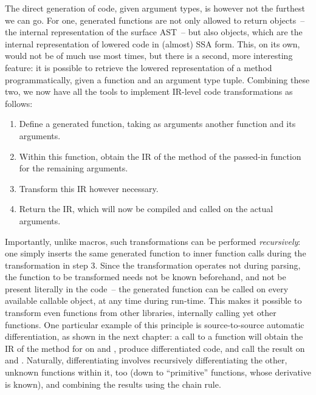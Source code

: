 The direct generation of code, given argument types, is however not the furthest we can go.  For
one, generated functions are not only allowed to return  objects~-- the internal
representation of the surface AST~-- but also  objects, which are the internal
representation of lowered code in (almost) SSA form.  This, on its own, would not be of much use
most times, but there is a second, more interesting feature: it is possible to retrieve the lowered
representation of a method programmatically, given a function and an argument type tuple.  Combining
these two, we now have all the tools to implement IR-level code transformations as follows:
\begin{enumerate}
  \firmlist
\item Define a generated function, taking as arguments another function and its arguments.
\item Within this function, obtain the IR of the method of the passed-in function for the remaining
  arguments.
\item Transform this IR however necessary.
\item Return the IR, which will now be compiled and called on the actual arguments.
\end{enumerate}
Importantly, unlike macros, such transformations can be performed \emph{recursively}: one simply
inserts the same generated function to inner function calls during the transformation in step 3.
Since the transformation operates not during parsing, the function to be transformed needs not be
known beforehand, and not be present literally in the code~-- the generated function can be called
on every available callable object, at any time during run-time.  This makes it possible to transform
even functions from other libraries, internally calling yet other functions.  One particular example
of this principle is source-to-source automatic differentiation, as shown in the next chapter: a
call to a function  will obtain the IR of the method for  on
 and , produce differentiated code, and call the result on
 and .  Naturally, differentiating  involves recursively differentiating
the other, unknown functions within it, too (down to \enquote{primitive} functions, whose derivative
is known), and combining the results using the chain rule.

